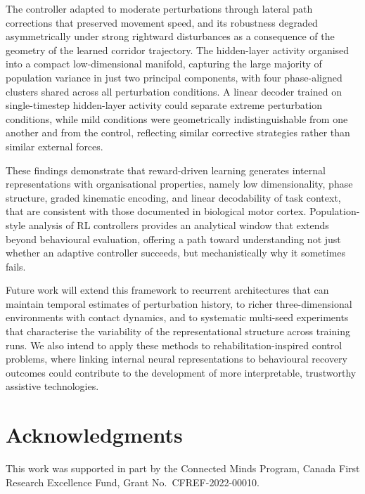 \documentclass{article}
\begin{document}
The controller adapted to moderate perturbations through lateral path
corrections that preserved movement speed, and its robustness degraded
asymmetrically under strong rightward disturbances as a consequence of
the geometry of the learned corridor trajectory.
The hidden-layer activity organised into a compact low-dimensional manifold,
capturing the large majority of population variance in just two principal
components, with four phase-aligned clusters shared across all perturbation
conditions.
A linear decoder trained on single-timestep hidden-layer activity could
separate extreme perturbation conditions, while mild conditions were
geometrically indistinguishable from one another and from the control,
reflecting similar corrective strategies rather than similar external
forces.

These findings demonstrate that reward-driven learning generates internal
representations with organisational properties, namely low dimensionality,
phase structure, graded kinematic encoding, and linear decodability of task
context, that are consistent with those documented in biological motor cortex.
Population-style analysis of RL controllers provides an analytical window
that extends beyond behavioural evaluation, offering a path toward
understanding not just whether an adaptive controller succeeds, but
mechanistically why it sometimes fails.

Future work will extend this framework to recurrent architectures that
can maintain temporal estimates of perturbation history, to richer
three-dimensional environments with contact dynamics, and to systematic
multi-seed experiments that characterise the variability of the
representational structure across training runs.
We also intend to apply these methods to rehabilitation-inspired control
problems, where linking internal neural representations to behavioural
recovery outcomes could contribute to the development of more
interpretable, trustworthy assistive technologies.

\section*{Acknowledgments}

This work was supported in part by the Connected Minds Program,
Canada First Research Excellence Fund,
Grant No.~CFREF-2022-00010.



\end{document}
